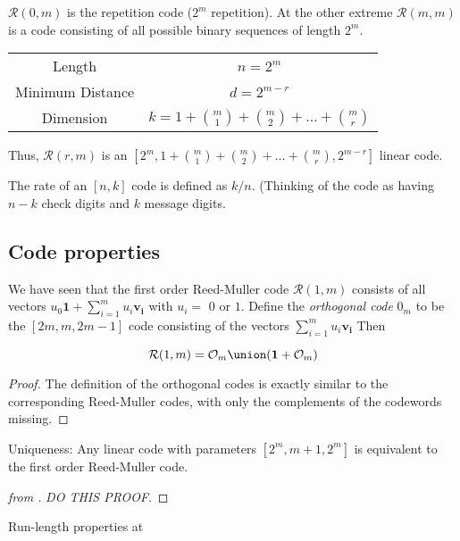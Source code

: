 \documentclass{article}
\newcommand{\RM}[2]{\ensuremath{\mathcal{R}(#1,#2)}}
\newcommand{\rem}{Reed-Muller}
\newcommand{\V}[1]{\ensuremath{\mathbf{#1}}}
\theoremstyle{plain}
\begin{document}
$\RM{0}{m} $ is the repetition code ($2^m$ repetition). At the other extreme $\RM{m}{m}$ is a code consisting of all possible binary sequences of length $2^m$.


\begin{tabular}[center]{|c|c|}
\hline
Length & $n = 2^m$ \\
Minimum Distance & $d = 2^{m-r}$ \\
Dimension & $k= 1+\binom{m}{1}+\binom{m}{2}+\ldots+\binom{m}{r}$ \\
\hline
\end{tabular}

Thus, $\RM{r}{m}$ is an $[2^m,1+\binom{m}{1}+\binom{m}{2}+\ldots+\binom{m}{r}, 2^{m-r}]$ linear code.

The rate of an $[n, k]$ code is deﬁned as $k/n$. 
(Thinking of the code as having $n − k$ check digits and $k$ message 
digits.


\subsection{Code properties}
\label{properies}

We have seen that the first order Reed-Muller code $\RM{1}{m}$ consists of all vectors $u_0\V{1} + \sum_{i=1}^m{u_i\V{v_i}} $ with $u_i=$ $0$ or $1$. 
Define the \emph{orthogonal code} $\mathcal{0}_m$ to be the $[2m, m, 2m−1]$ code consisting of the vectors $ \sum_{i=1}^m{u_i\V{v_i}} $
Then
\begin{theorem}
  \begin{equation*}
  \RM{1}{m} = \mathcal{O}_m \union (\V{1} + \mathcal{O}_m) 
\end{equation*}
\begin{proof}
  The definition of the orthogonal codes is exactly similar to the corresponding \rem{} codes, with only the complements of the codewords missing. 
\end{proof}
\end{theorem}

 
\begin{theorem}
  Uniqueness: Any linear code with parameters $[2^m, m+1, 2^{m} ]$ is equivalent to the first order \rem{} code.
\begin{proof}[from \cite{uniq}]
  \emph{DO THIS PROOF}.
\end{proof}
\end{theorem}

Run-length properties at \cite{runlen}
\end{document}
